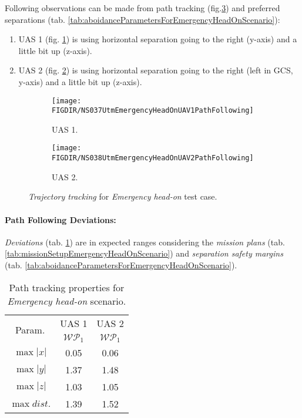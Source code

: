 Following observations can be made from path tracking (fig.\ref{fig:emergencyHeadOnTrajectoryTrackingPerformance}) and preferred separations (tab. \ref{tab:aboidanceParametersForEmergencyHeadOnScenario}):

\begin{enumerate}
    \item UAS 1 (fig. \ref{fig:emergencyHeadOnUAS1PathTracking}) is using horizontal separation going to the right (y-axis) and a little bit up (z-axis).
    
    \item UAS 2 (fig. \ref{fig:emergencyHeadOnUAS2PathTracking}) is using horizontal separation going to the right (left in GCS, y-axis) and a little bit up (z-axis).
\end{enumerate}

\begin{figure}[H]
	\centering
    \begin{subfigure}{0.48\textwidth}
    	\centering
        \texttt{[image: \\FIGDIR/NS037UtmEmergencyHeadOnUAV1PathFollowing]}
        \caption{UAS 1.}
        \label{fig:emergencyHeadOnUAS1PathTracking}
    \end{subfigure}
    \begin{subfigure}{0.48\textwidth}
    	\centering
        \texttt{[image: \\FIGDIR/NS038UtmEmergencyHeadOnUAV2PathFollowing]} 
        \caption{UAS 2.}
        \label{fig:emergencyHeadOnUAS2PathTracking}
    \end{subfigure}
    \caption{\emph{Trajectory tracking} for \emph{Emergency head-on} test case. }
    \label{fig:emergencyHeadOnTrajectoryTrackingPerformance}
\end{figure}


\paragraph{Path Following Deviations:} \emph{Deviations} (tab. \ref{tab:pathTrackingParametersForEmergencyHeadOn}) are in expected ranges considering the \emph{mission plans} (tab. \ref{tab:missionSetupEmergencyHeadOnScenario}) and \emph{separation safety margins} (tab. \ref{tab:aboidanceParametersForEmergencyHeadOnScenario}).


\begin{table}[H]
    \centering
    \begin{tabular}{c||c|c}
        \multirow{2}{*}{Param.} & UAS 1     & UAS 2\\\cline{2-3}
                        & $\mathscr{WP}_1$  & $\mathscr{WP}_1$\\\hline\hline
          $\max |x|$    & 0.05              & 0.06 \\\hline
          $\max |y|$    & 1.37              & 1.48 \\\hline
          $\max |z|$    & 1.03              & 1.05 \\\hline
          $\max dist.$  & 1.39              & 1.52 \\
    \end{tabular}
    \caption{Path tracking properties for \emph{Emergency head-on} scenario.}
    \label{tab:pathTrackingParametersForEmergencyHeadOn}
\end{table}

